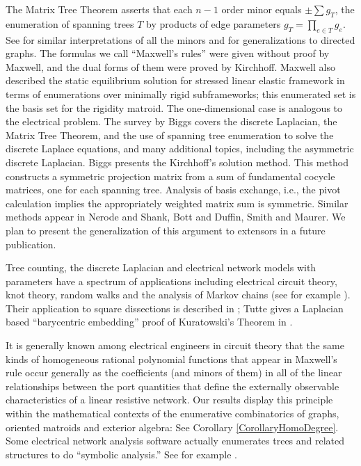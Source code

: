 \documentclass[12pt]{article}
\theoremstyle{definition}
\begin{document}
The Matrix Tree Theorem asserts that each $n-1$ order minor 
equals $\pm\sum g_T$, the enumeration of spanning trees $T$ by products
of edge parameters $g_T=\prod_{e \in T}g_e$.  
See \cite{sdcMTT} for 
similar interpretations of all the minors and 
for generalizations to directed graphs.
The formulas we call ``Maxwell's rules'' were given without
proof by Maxwell\cite{MaxR}, and the dual forms of them were proved
by Kirchhoff\cite{Kirchhoff}.
Maxwell also described the static equilibrium solution for 
stressed linear elastic
framework in terms of enumerations over minimally rigid 
subframeworks\cite{MaxwellsFramesPaper}; this enumerated set is the basis
set for the rigidity matroid\cite{RigidityBook}.  The one-dimensional case
is analogous to the electrical problem.
The survey by Biggs \cite{BiggsAlgPotTheory}
covers the discrete Laplacian, the Matrix Tree Theorem, and the
use of spanning tree enumeration to solve the discrete Laplace equations, and
many additional topics, including the asymmetric discrete Laplacian.
Biggs presents the Kirchhoff's solution method.
This method constructs a symmetric projection matrix from a sum of fundamental
cocycle matrices, one for each spanning tree.  Analysis of basis exchange,
i.e., the pivot calculation
implies the appropriately weighted matrix sum is symmetric.  
Similar methods appear in Nerode and Shank\cite{NerodeShank}, 
Bott and Duffin\cite{BottDuffinAlgNetworks}, Smith\cite{SmithElec}
and Maurer\cite{Maurer76}.
We plan to present
the generalization of this argument to extensors in a future publication.

Tree counting, the discrete Laplacian and electrical network models
with parameters 
have a spectrum of applications including  electrical circuit theory,
knot theory, random walks and the analysis of Markov chains
(see for example
\cite{DoyleSnellRandom,BiggsAlgPotTheory,ChungYaoCovHeatKer,ChungYaoGreens}).
Their application to square dissections
is described in \cite{BSST,TutteBook}; Tutte gives a Laplacian based 
``barycentric embedding'' proof
of Kuratowski's Theorem in \cite{HowToDraw}.

It is generally known among electrical engineers in circuit theory
that the same kinds of homogeneous rational polynomial functions that appear
in Maxwell's rule occur generally as the coefficients (and 
minors of them) in all of the 
linear relationships between the port quantities that define the
externally observable characteristics of a linear resistive network.
Our results display this principle within the mathematical contexts of 
the enumerative combinatorics of graphs, oriented matroids and 
exterior algebra: See Corollary \ref{CorollaryHomoDegree}.
Some electrical network analysis software actually enumerates trees and related
structures to do ``symbolic analysis.''
See for example 
\cite{TraWilBilinear,ThulasiramanSwamyBook,someEEBooks,sdcISCAS98}.  
\end{document}
